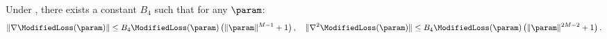 

\begin{lemma}\label{lem:gradient_hessian_bound}
Under , there exists a constant $B_4$ such that for any $\param$:
\begin{equation}
\label{eq:gradient_hessian_bound}
   \|\nabla \ModifiedLoss (\param) \| \le B_4 \ModifiedLoss(\param ) \left( \| \param \|^{M-1} + 1 \right), \quad \| \nabla^2 \ModifiedLoss (\param) \| \le B_4 \ModifiedLoss(\param ) \left( \| \param \|^{2M-2} + 1 \right). 
\end{equation}
\end{lemma}


